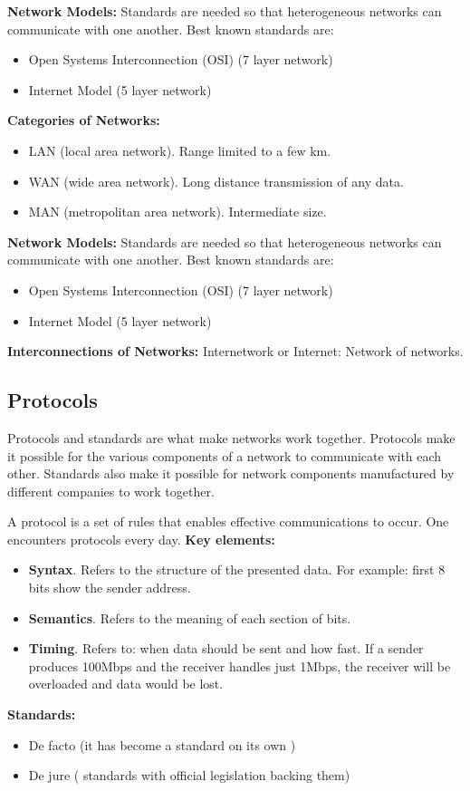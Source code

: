 \documentclass[12pt,a4paper]{report}
\begin{document}
\textbf{Network Models:}
Standards are needed so that heterogeneous networks can communicate with one another. Best known standards are:
\begin{itemize}
\item Open Systems Interconnection (OSI) (7 layer network)
\item Internet Model (5 layer network)
\end{itemize}
\textbf{Categories of Networks: }
\begin{itemize}
\item LAN (local area network). Range limited to a few km.
\item WAN (wide area network). Long distance transmission of any data.
\item MAN (metropolitan area network). Intermediate size.
\end{itemize}
\textbf{Network Models:}
Standards are needed so that heterogeneous networks can communicate with one another. Best known standards are:
\begin{itemize}
\item Open Systems Interconnection (OSI) (7 layer network)
\item Internet Model (5 layer network)
\end{itemize}
\textbf{Interconnections of Networks: }Internetwork or Internet: Network of networks.


\subsection{Protocols}
Protocols and standards are what make networks work together. Protocols make it possible for the various components of a network to communicate with each other. Standards also make it possible for network components manufactured by different companies to work together.\newline

A protocol is a set of rules that enables effective communications to occur. One encounters protocols every day.\newline
\textbf{Key elements:}
\begin{itemize}
\item \textbf{Syntax}. Refers to the structure of the presented data. For example: first 8 bits show the sender address.
\item \textbf{Semantics}. Refers to the meaning of each section of bits.
\item \textbf{Timing}. Refers to: when data should be sent and how fast. If a sender produces 100Mbps and the receiver handles just 1Mbps, the receiver will be overloaded and data would be lost.
\end{itemize}
\textbf{Standards:}
\begin{itemize}
\item De facto (it has become a standard on its own )
\item De jure ( standards with official legislation backing them)
\end{itemize}
\end{document}
